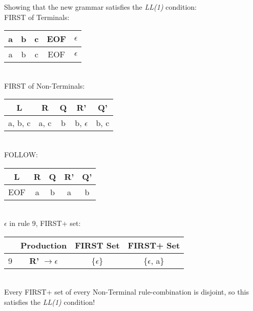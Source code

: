 \documentclass[11pt]{article} %
\begin{document}
\noindent Showing that the new grammar satisfies the \textit{LL(1)} condition: \\

\noindent FIRST of Terminals: \\

\begin{tabular}{|c|c|c|c|c|} \hline 
\textbf{a}
& \textbf{b}
& \textbf{c}
& \textbf{EOF}
& \textbf{$\epsilon$}\\\hline 

a
& b
& c
& EOF
& $\epsilon$\\\hline  
\end{tabular} \\

\noindent FIRST of Non-Terminals: \\

\begin{tabular}{|c|c|c|c|c|} \hline 
\textbf{L}
& \textbf{R}
& \textbf{Q}
& \textbf{R'}
& \textbf{Q'} \\\hline 

a, b, c
& a, c
& b
& b, $\epsilon$
& b, c \\\hline  
\end{tabular} \\

\noindent FOLLOW: \\

\begin{tabular}{|c|c|c|c|c|} \hline 
\textbf{L}
& \textbf{R}
& \textbf{Q}
& \textbf{R'}
& \textbf{Q'} \\\hline

EOF
& a
& b
& a
& b \\\hline  
\end{tabular} \\

\noindent $\epsilon$ in rule 9, FIRST+ set: \\

\begin{tabular}{|c|c|c|c|} \hline 
& Production
& FIRST Set
& FIRST+ Set \\\hline

9
& \textbf{R'} $\rightarrow \epsilon$
& \{$\epsilon$\}
& \{$\epsilon$, a\} \\\hline 
\end{tabular}\\

\noindent Every FIRST+ set of every Non-Terminal rule-combination is disjoint, so this satisfies the \textit{LL(1)} condition!\\
\fi
\end{document}
